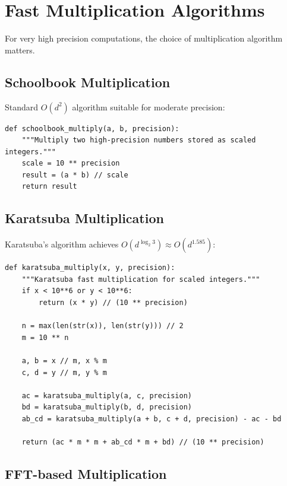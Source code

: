 \section{Fast Multiplication Algorithms}

For very high precision computations, the choice of multiplication algorithm matters.

\subsection{Schoolbook Multiplication}

Standard $O(d^2)$ algorithm suitable for moderate precision:

\begin{lstlisting}[caption={Schoolbook multiplication}, label=lst:schoolbook_mul]
def schoolbook_multiply(a, b, precision):
    """Multiply two high-precision numbers stored as scaled integers."""
    scale = 10 ** precision
    result = (a * b) // scale
    return result
\end{lstlisting}

\subsection{Karatsuba Multiplication}

Karatsuba's algorithm achieves $O(d^{\log_2 3}) \approx O(d^{1.585})$:

\begin{lstlisting}[caption={Karatsuba multiplication}, label=lst:karatsuba_mul]
def karatsuba_multiply(x, y, precision):
    """Karatsuba fast multiplication for scaled integers."""
    if x < 10**6 or y < 10**6:
        return (x * y) // (10 ** precision)
    
    n = max(len(str(x)), len(str(y))) // 2
    m = 10 ** n
    
    a, b = x // m, x % m
    c, d = y // m, y % m
    
    ac = karatsuba_multiply(a, c, precision)
    bd = karatsuba_multiply(b, d, precision)
    ab_cd = karatsuba_multiply(a + b, c + d, precision) - ac - bd
    
    return (ac * m * m + ab_cd * m + bd) // (10 ** precision)
\end{lstlisting}

\subsection{FFT-based Multiplication}

